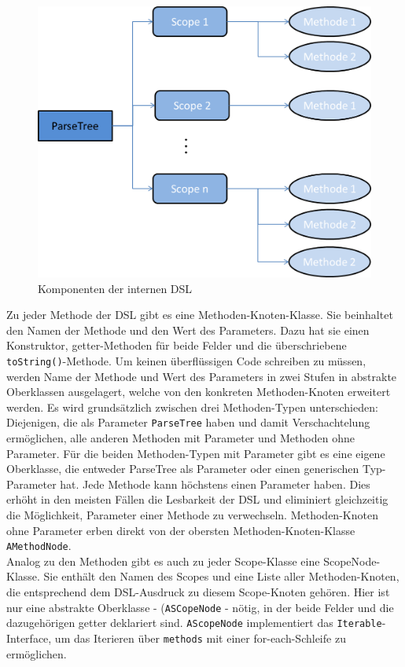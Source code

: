 \begin{figure}[H]
\centering\includegraphics[width=.8\textwidth]{images/kapitel4/parseTree.png}
\caption{Komponenten der internen DSL}
\label{fig:parse-tree}
\end{figure}

Zu jeder Methode der DSL gibt es eine Methoden-Knoten-Klasse. Sie beinhaltet den Namen der Methode und den Wert des Parameters. Dazu hat sie einen Konstruktor, getter-Methoden für beide Felder und die überschriebene \texttt{toString()}-Methode. Um keinen überflüssigen Code schreiben zu müssen, werden Name der Methode und Wert des Parameters in zwei Stufen in abstrakte Oberklassen ausgelagert, welche von den konkreten Methoden-Knoten erweitert werden. Es wird grundsätzlich zwischen drei Methoden-Typen unterschieden: Diejenigen, die als Parameter \texttt{ParseTree} haben und damit Verschachtelung ermöglichen, alle anderen Methoden mit Parameter und Methoden ohne Parameter. Für die beiden Methoden-Typen mit Parameter gibt es eine eigene Oberklasse, die entweder ParseTree als Parameter oder einen generischen Typ-Parameter hat. Jede Methode kann höchstens einen Parameter haben. Dies erhöht in den meisten Fällen die Lesbarkeit der DSL und eliminiert gleichzeitig die Möglichkeit, Parameter einer Methode zu verwechseln. Methoden-Knoten ohne Parameter erben direkt von der obersten Methoden-Knoten-Klasse \texttt{AMethodNode}.\\
Analog zu den Methoden gibt es auch zu jeder Scope-Klasse eine ScopeNode-Klasse. Sie enthält den Namen des Scopes und eine Liste aller Methoden-Knoten, die entsprechend dem DSL-Ausdruck zu diesem Scope-Knoten gehören. Hier ist nur eine abstrakte Oberklasse - (\texttt{ASCopeNode} -  nötig, in der beide Felder und die dazugehörigen getter deklariert sind. \texttt{AScopeNode} implementiert das \texttt{Iterable}-Interface, um das Iterieren über \texttt{methods} mit einer for-each-Schleife zu ermöglichen.

